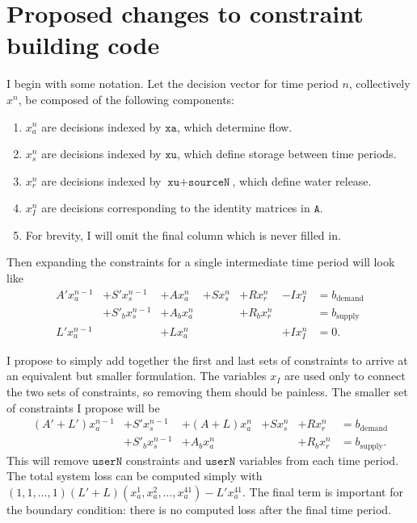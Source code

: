 \documentclass[11pt]{article}
\newcommand{\A}{\texttt{A}}
\newcommand{\xa}{\texttt{xa}}
\newcommand{\xu}{\texttt{xu}}
\newcommand{\sourceN}{\texttt{sourceN}}
\newcommand{\userN}{\texttt{userN}}
\begin{document}
\section*{Proposed changes to constraint building code}

I begin with some notation.
Let the decision vector for time period $n$, collectively $x^n$, be composed of the following components:
\begin{enumerate}
	\item $x^n_a$ are decisions indexed by $\xa$, which determine flow.
	\item $x^n_s$ are decisions indexed by $\xu$, which define storage between time periods.
	\item $x^n_r$ are decisions indexed by $\xu+\sourceN$, which define water release.
	\item $x^n_I$ are decisions corresponding to the identity matrices in $\A$.
	\item For brevity, I will omit the final column which is never filled in.
\end{enumerate}

Then expanding the constraints for a single intermediate time period will look like
\[
	\begin{array}{rrrrrrl}
		A' x^{n-1}_a & + S' x^{n-1}_s   & + A x^n_a   & + S x^n_s & + R x^n_r   & - Ix^n_I  & = b_\text{demand} \\
		             & + S'_b x^{n-1}_s & + A_b x^n_a &           & + R_b x^n_r &           & = b_\text{supply} \\
		L' x^{n-1}_a &                  & + L x^n_a   &           &             & + I x^n_I & = 0.
	\end{array}
\]

I propose to simply add together the first and last sets of constraints to arrive at an equivalent but smaller formulation.
The variables $x_I$ are used only to connect the two sets of constraints, so removing them should be painless.
The smaller set of constraints I propose will be
\[
	\begin{array}{rrrrrl}
		(A'+L') x^{n-1}_a & + S' x^{n-1}_s   & + (A+L) x^n_a   & + S x^n_s & + R x^n_r   & = b_\text{demand} \\
		                  & + S'_b x^{n-1}_s & + A_b x^n_a     &           & + R_b x^n_r & = b_\text{supply}.
	\end{array}
\]
This will remove $\userN$ constraints and $\userN$ variables from each time period.
The total system loss can be computed simply with $(1, 1, \dots, 1) (L'+L) (x^1_a, x^2_a, \dots, x^{41}_a) - L' x^{41}_a$.
The final term is important for the boundary condition: there is no computed loss after the final time period.
\end{document}
